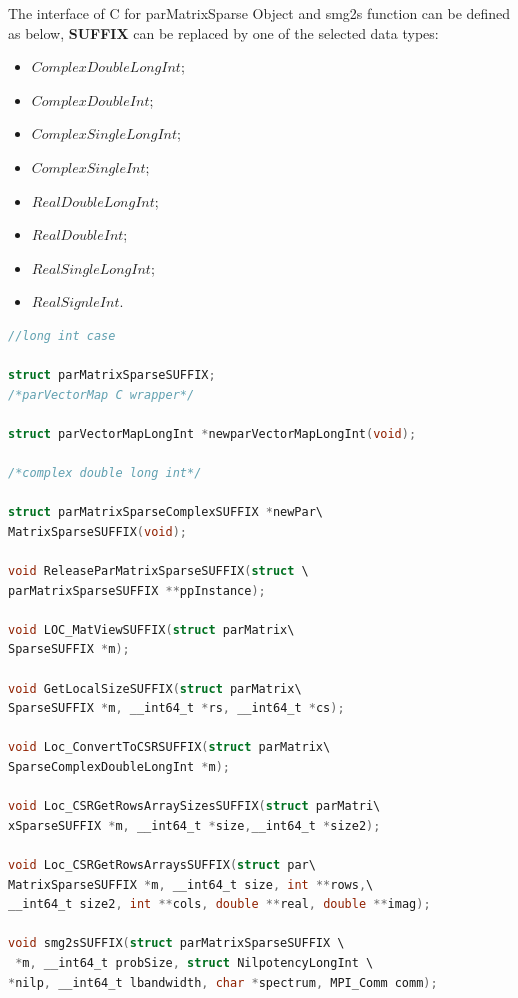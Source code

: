 \documentclass[a4paper, 10 pt]{report}
\begin{document}
	The interface of C for parMatrixSparse Object and smg2s function can be defined as below, \textbf{SUFFIX} can be replaced by one of the selected data types:
	
	\begin{multicols}{2}
	\begin{itemize}
		\item $ComplexDoubleLongInt$;
		\item $ComplexDoubleInt$;
		\item $ComplexSingleLongInt$;
		\item $ComplexSingleInt$;
		\item $RealDoubleLongInt$;
		\item $RealDoubleInt$;
		\item $RealSingleLongInt$;
		\item $RealSignleInt$.
	\end{itemize}
	\end{multicols}

	\begin{lstlisting}[language=C,frame=single,	basicstyle=\footnotesize]
//long int case

struct parMatrixSparseSUFFIX;   
/*parVectorMap C wrapper*/

struct parVectorMapLongInt *newparVectorMapLongInt(void);

/*complex double long int*/
   
struct parMatrixSparseComplexSUFFIX *newPar\
MatrixSparseSUFFIX(void);

void ReleaseParMatrixSparseSUFFIX(struct \
parMatrixSparseSUFFIX **ppInstance);

void LOC_MatViewSUFFIX(struct parMatrix\
SparseSUFFIX *m);

void GetLocalSizeSUFFIX(struct parMatrix\
SparseSUFFIX *m, __int64_t *rs, __int64_t *cs);

void Loc_ConvertToCSRSUFFIX(struct parMatrix\
SparseComplexDoubleLongInt *m);
   
void Loc_CSRGetRowsArraySizesSUFFIX(struct parMatri\
xSparseSUFFIX *m, __int64_t *size,__int64_t *size2);

void Loc_CSRGetRowsArraysSUFFIX(struct par\
MatrixSparseSUFFIX *m, __int64_t size, int **rows,\
__int64_t size2, int **cols, double **real, double **imag);

void smg2sSUFFIX(struct parMatrixSparseSUFFIX \
 *m, __int64_t probSize, struct NilpotencyLongInt \
*nilp, __int64_t lbandwidth, char *spectrum, MPI_Comm comm);
   
	\end{lstlisting}
\end{document}
